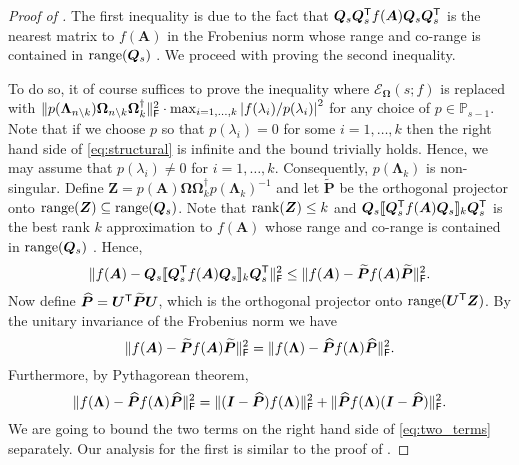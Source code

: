 \begin{proof}[Proof of ]
The first inequality is due to the fact that $\bm{Q}_s\bm{Q}_s^{\textsf{\textup{T}}}f(\bm{A})\bm{Q}_s\bm{Q}_s^{\textsf{\textup{T}}}$ is the nearest matrix to $f(\bm{A})$ in the Frobenius norm whose range and co-range is contained in $\operatorname{range}(\bm{Q}_s)$ \cite[Lemma 3.3]{funnystrom2}. 
We proceed with proving the second inequality. 

To do so, it of course suffices to prove the inequality where $\mathcal{E}_{\bm{\Omega}}(s;f)$ is replaced with $\|p(\bm{\Lambda}_{n \setminus k}) \bm{\Omega}_{n \setminus k} \bm{\Omega}_k^{\dagger}\|_{\textsf{\textup{F}}}^2\cdot \max_{i=1,\ldots,k} \left|{f(\lambda_i)}/{p(\lambda_i)}\right|^2$ for any choice of $p \in \mathbb{P}_{s-1}$.
Note that if we choose $p$ so that $p(\lambda_i) = 0$ for some $i = 1,\ldots,k$ then the right hand side of \eqref{eq:structural} is infinite and the bound trivially holds. 
Hence, we may assume that $p(\lambda_i) \neq 0$ for $i = 1,\ldots,k$.
Consequently, $p(\bm{\Lambda}_k)$ is non-singular.
Define $\bm{Z} = p(\bm{A}) \bm{\Omega} \bm{\Omega}_k^{\dagger} p(\bm{\Lambda}_k)^{-1}$ and let $\widetilde{\bm{P}}$ be the orthogonal projector onto $\operatorname{range}(\bm{Z}) \subseteq \operatorname{range}(\bm{Q}_s)$.
Note that $\operatorname{rank}(\bm{Z}) \leq k$ and $\bm{Q}_s \llbracket\bm{Q}_s^{\textsf{\textup{T}}} f(\bm{A})\bm{Q}_s\rrbracket_{k} \bm{Q}_s^{\textsf{\textup{T}}}$ is the best rank $k$ approximation to $f(\bm{A})$ whose range and co-range is contained in $\operatorname{range}(\bm{Q}_s)$ \cite[Lemma 3.3]{funnystrom2}.
Hence,
\begin{equation*}
    \|f(\bm{A}) - \bm{Q}_s \llbracket\bm{Q}_s^{\textsf{\textup{T}}} f(\bm{A})\bm{Q}_s\rrbracket_{k} \bm{Q}_s^{\textsf{\textup{T}}} \|_{\textsf{\textup{F}}}^2 \leq \|f(\bm{A}) - \widetilde{\bm{P}}f(\bm{A})\widetilde{\bm{P}} \|_{\textsf{\textup{F}}}^2.
\end{equation*}
Now define $\widehat{\bm{P}} = \bm{U}^{\textsf{\textup{T}}} \widetilde{\bm{P}} \bm{U}$, which is the orthogonal projector onto $\operatorname{range}(\bm{U}^{\textsf{\textup{T}}} \bm{Z})$. By the unitary invariance of the Frobenius norm we have
\begin{equation*}
    \|f(\bm{A}) - \widetilde{\bm{P}}f(\bm{A})\widetilde{\bm{P}} \|_{\textsf{\textup{F}}}^2 = \|f(\bm{\Lambda}) - \widehat{\bm{P}} f(\bm{\Lambda}) \widehat{\bm{P}}\|_{\textsf{\textup{F}}}^2.
\end{equation*}
Furthermore, by Pythagorean theorem,
\begin{equation}\label{eq:two_terms}
    \|f(\bm{\Lambda}) - \widehat{\bm{P}} f(\bm{\Lambda}) \widehat{\bm{P}}\|_{\textsf{\textup{F}}}^2 = \|(\bm{I} - \widehat{\bm{P}}) f(\bm{\Lambda})\|_{\textsf{\textup{F}}}^2 + \|\widehat{\bm{P}} f(\bm{\Lambda})(\bm{I}-\widehat{\bm{P}})\|_{\textsf{\textup{F}}}^2.
\end{equation}
We are going to bound the two terms on the right hand side of \eqref{eq:two_terms} separately. 
Our analysis for the first is similar to the proof of \cite[Theorem 9.1]{rsvd}.


\end{proof}
